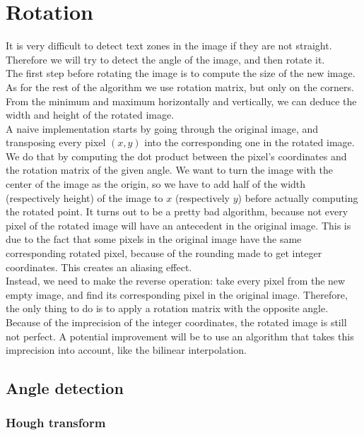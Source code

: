 \section{Rotation}

It is very difficult to detect text zones in the image if they are not straight.
Therefore we will try to detect the angle of the image, and then
rotate it.\\

The first step before rotating the image is to compute the size of the new
image. As for the rest of the algorithm we use rotation matrix, but only on the
corners. From the minimum and maximum horizontally and vertically, we can deduce
the width and height of the rotated image.\\

A naive implementation starts by going through the original image, and
transposing every pixel $(x, y)$ into the corresponding one in the rotated
image. We do that by computing the dot product between the pixel's coordinates
and the rotation matrix of the given angle. We want to turn the image with the
center of the image as the origin, so we have to add half of the width
(respectively height) of the image to $x$ (respectively $y$) before actually
computing the rotated point. It turns out to be a pretty bad algorithm, because
not every pixel of the rotated image will have an antecedent in the original
image. This is due to the fact that some pixels in the original image have the
same corresponding rotated pixel, because of the rounding made to get integer
coordinates. This creates an aliasing effect.\\

Instead, we need to make the reverse operation: take every pixel from the new
empty image, and find its corresponding pixel in the original image. Therefore,
the only thing to do is to apply a rotation matrix with the opposite angle.\\

Because of the imprecision of the integer coordinates, the rotated image is
still not perfect. A potential improvement will be to use an algorithm that
takes this imprecision into account, like the bilinear interpolation.

\subsection{Angle detection}
\subsubsection{Hough transform}

